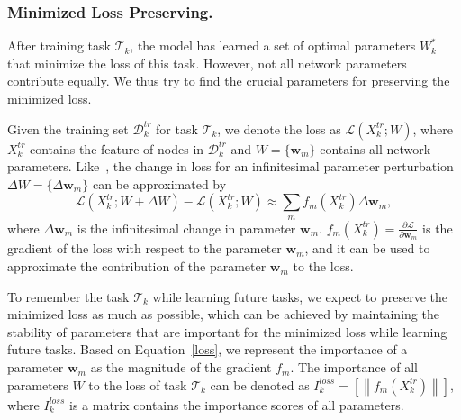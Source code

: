 \documentclass[letterpaper]{article} %
\begin{document}
\subsubsection{Minimized Loss Preserving.}
After training task $\mathcal{T}_k$, the model has learned
a set of optimal parameters $W_k^*$
that minimize the loss of this task.
However, not all network parameters contribute equally.
We thus try to find the crucial parameters for
preserving the minimized loss.

Given the training set $\mathcal{D}_k^{tr}$
for task $\mathcal{T}_k$,
we denote the loss as $\mathcal{L}(X_k^{tr};W)$,
where $X_k^{tr}$ contains the feature of nodes in $\mathcal{D}_k^{tr}$ and $W=\{\boldsymbol{w}_m\}$ contains all network parameters.
Like~\cite{zenke2017continual}, the change in loss for an infinitesimal parameter perturbation $\Delta W =\{\Delta \boldsymbol{w}_m\}$ can be approximated by
\begin{equation}
\label{loss}
  \mathcal{L}(X_k^{tr};W+ \Delta W)-\mathcal{L}(X_k^{tr};W) \approx \sum_m f_m(X_k^{tr}) \Delta \boldsymbol{w}_m,
\end{equation}
where $\Delta \boldsymbol{w}_m$ is the infinitesimal change in parameter $\boldsymbol{w}_m$.  $f_m(X_k^{tr})=\frac{\partial \mathcal{L}}{\partial{\boldsymbol{w}_m}}$ is the gradient of the loss with respect to the parameter $\boldsymbol{w}_m$, and it can be used to approximate the contribution of the parameter $\boldsymbol{w}_m$ to the loss.

To remember the task $\mathcal{T}_k$ while learning future tasks, we expect to preserve the
minimized loss as much as possible,
which can be achieved by
maintaining the stability of parameters that are important for the minimized loss while learning future tasks.
Based on Equation~\ref{loss},
we represent the importance of a parameter $\boldsymbol{w}_m$
as the magnitude of the gradient $f_m$.
The importance of all parameters $W$ to the loss
of task $\mathcal{T}_k$ can be denoted as
$I_{k}^{loss}=[\left \|f_m(X_k^{tr})\right \|]$,
where $I_{k}^{loss}$ is a matrix contains the importance scores of all parameters.
\end{document}

